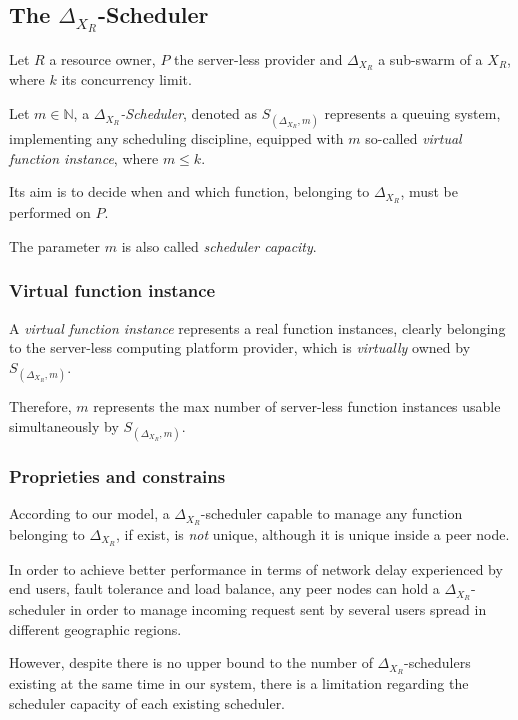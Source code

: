 \documentclass[10pt,a4paper]{article}
\theoremstyle{definition}
\begin{document}
\subsection{The $\Delta_{X_{R}}$-Scheduler}

Let $R$ a resource owner, $P$ the server-less provider and $\Delta_{X_{R}}$ a sub-swarm of a $X_{R}$, where $k$ its concurrency limit.

Let $m \in \mathbb{N}$, a \textit{$\Delta_{X_{R}}$-Scheduler}, denoted as $S_{(\Delta_{X_{R}},m)}$ represents a queuing system, implementing any scheduling discipline, equipped with $m$ so-called \textit{virtual function instance}, where $m \leq k$.

Its aim is to decide when and which function, belonging to $\Delta_{X_{R}}$, must be performed on $P$. 

The parameter $m$ is also called \textit{scheduler capacity}.

\subsubsection{Virtual function instance}

A \textit{virtual function instance} represents a real function instances, clearly belonging to the server-less computing platform provider, which is \textit{virtually} owned by $S_{(\Delta_{X_{R}},m)}$.

Therefore, $m$ represents the max number of server-less function instances usable simultaneously by $S_{(\Delta_{X_{R}},m)}$.

\subsubsection{Proprieties and constrains}

According to our model, a $\Delta_{X_{R}}$-scheduler capable to manage any function belonging to $\Delta_{X_{R}}$, if exist, is \textit{not} unique, although it is unique inside a peer node. 

In order to achieve better performance in terms of network delay experienced by end users, fault tolerance and load balance, any peer nodes can hold a $\Delta_{X_{R}}$-scheduler in order to manage incoming request sent by several users spread in different geographic regions. 

However, despite there is no upper bound to the number of $\Delta_{X_{R}}$-schedulers existing at the same time in our system, there is a limitation regarding the scheduler capacity of each existing scheduler. 
\end{document}
